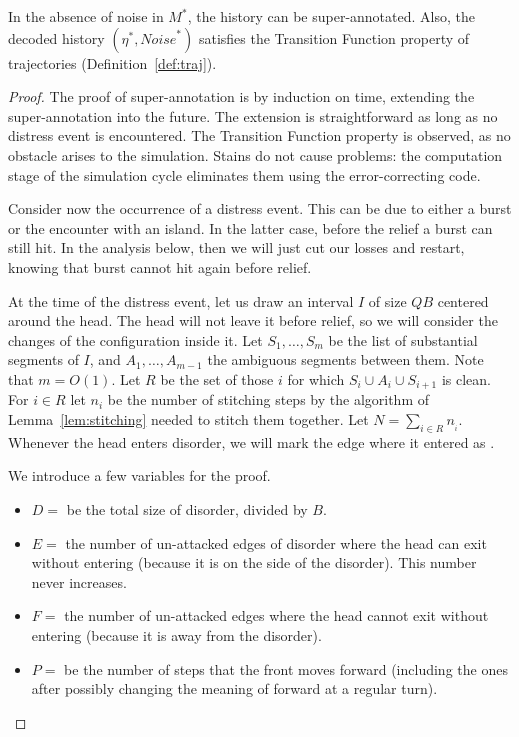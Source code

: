 \documentclass[11pt]{memoir}
\theoremstyle{definition} %
\def\B{B}
\newcommand{\Noise}{\mathit{Noise}}
\newcommand{\Q}{Q}
\begin{document}
\begin{lemma}[Healing]\label{lem:healing}
In the absence of noise in \( M^{*} \), the history can be super-annotated.
Also, the decoded history \( (\eta^{*},\Noise^{*}) \) satisfies the Transition Function property 
of trajectories (Definition~\ref{def:traj}).
\end{lemma}
\begin{proof}
The proof of super-annotation is by induction on time, extending the super-annotation into the future.
The extension is straightforward as long as no distress event is encountered.
The Transition Function property is observed, as no obstacle arises to the simulation.
Stains do not cause problems: the computation stage of the simulation cycle eliminates them
using the error-correcting code.

Consider now the occurrence of a distress event.
This can be due to either a burst or the encounter with an island.
In the latter case, before the relief a burst can still hit.
In the analysis below, then we will just cut our losses and restart, knowing that 
burst cannot hit again before relief.

At the time of the distress event, let us draw an interval \( I \) of size \( \Q\B \) centered 
around the head.
The head will not leave it before relief, so we will consider the changes of 
the configuration inside it.
Let \( S_{1},\dots,S_{m} \) be the list of substantial segments of \( I \), 
and \( A_{1},\dots,A_{m-1} \) the ambiguous segments between them.
Note that \( m=O(1) \).
Let \( R \) be the set of those \( i \) for which \( S_{i}\cup A_{i}\cup S_{i+1} \) is clean.
For \( i\in R \) let \( n_{i} \) be the number of 
stitching steps by the algorithm of Lemma~\ref{lem:stitching} needed to stitch them 
together.
Let \( N=\sum_{i\in R} n_{_{i}} \).
Whenever the head enters disorder, we will mark the edge where it entered as .

We introduce a few variables for the proof.
\begin{itemize}
\item\( D= \) be the total size of disorder, divided by \( \B \).
\item\( E= \) the number of un-attacked edges of disorder where the head can exit without
  entering (because it is on the side of the disorder).
  This number never increases.
\item \( F= \) the number of un-attacked edges where the head cannot exit without entering (because
  it is away from the disorder).
\item \( P= \) be the number of steps that the front moves forward (including the ones after possibly
changing the meaning of forward at a regular turn).
\end{itemize}


\end{proof}
\end{document}
